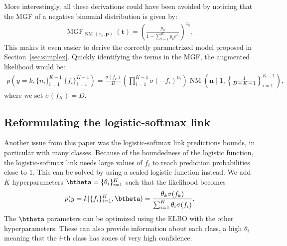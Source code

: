 More interestingly, all these derivations could have been avoided by noticing that the \ac{MGF} of a negative binomial distribution is given by:
\begin{align*}
    \operatorname{MGF}_{\operatorname{NM}(x_0,\boldsymbol{p})}(\boldsymbol{t}) = \left(\frac{p_0}{1-\sum_{i=1}^K p_k e^{t_i}}\right)^{x_0},
\end{align*}
This makes it even easier to derive the correctly parametrized model proposed in Section~\ref{sec:simplex}.
Quickly identifying the terms in the \ac{MGF}, the augmented likelihood would be:
\begin{align*}
    p\left(y=k,\{n_i\}_{i=1}^{K-1}|\{f_i\}_{i=1}^{K-1}\right) = \frac{\sigma(f_k)}{D}\left(\prod_{i=1}^{K-1}\sigma(-f_i)^{n_i}\right)\operatorname{NM}\left(\boldsymbol{n}\mid 1, \left\{\frac{1}{D+K-1}\right\}_{i=1}^{K-1}\right),
\end{align*}
where we set $\sigma(f_K) = D$.

\subsection{Reformulating the logistic-softmax link}
\label{sec:scale_multiclass}
Another issue from this paper was the logistic-softmax link predictions bounds, in particular with many classes.
Because of the boundedness of the logistic function, the logistic-softmax link needs large values of $f_i$ to reach prediction probabilities close to $1$.
This can be solved by using a scaled logistic function instead.
We add $K$ hyperparameters $\btheta=\{\theta_{i}\}_{i=1}^K$ such that the likelihood becomes
\begin{align*}
    p(y=k|\{f_i\}_{i=1}^K,\btheta) = \frac{\theta_k \sigma(f_k)}{\sum_{i=1}^K \theta_i \sigma(f_i)}.
\end{align*}
The $\btheta$ parameters can be optimized using the \ac{ELBO} with the other hyperparameters.
These can also provide information about each class, a high $\theta_i$ meaning that the $i$-th class has zones of very high confidence.

